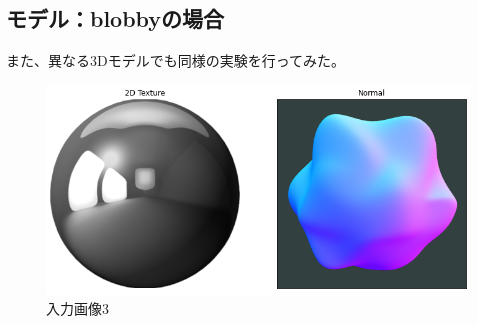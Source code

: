 \documentclass[dvipdfmx]{jsarticle}
\begin{document}
\subsection{モデル：blobbyの場合}
また、異なる3Dモデルでも同様の実験を行ってみた。
\begin{figure}[H]
  \centering
  \includegraphics[scale=0.4]{images/blo_input1.png}
  \caption{入力画像3}
\end{figure}
\end{document}
